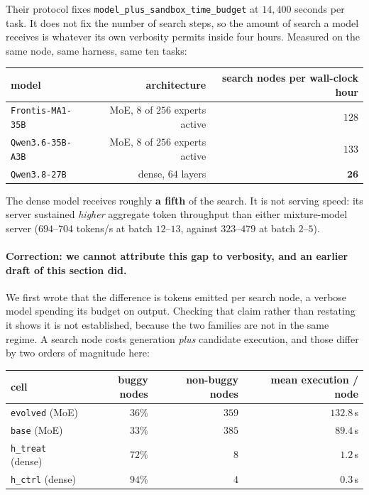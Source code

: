 Their protocol fixes \texttt{model\_plus\_sandbox\_time\_budget} at $14{,}400$ seconds per
task. It does not fix the number of search steps, so the amount of search a model receives is
whatever its own verbosity permits inside four hours. Measured on the same node, same harness,
same ten tasks:

\begin{center}
\begin{tabular}{lrr}
\toprule
model & architecture & search nodes per wall-clock hour \\
\midrule
\texttt{Frontis-MA1-35B}   & MoE, $8$ of $256$ experts active & $128$ \\
\texttt{Qwen3.6-35B-A3B}   & MoE, $8$ of $256$ experts active & $133$ \\
\texttt{Qwen3.8-27B}       & dense, $64$ layers               & $\mathbf{26}$ \\
\bottomrule
\end{tabular}
\end{center}

The dense model receives roughly \textbf{a fifth} of the search. It is not serving speed: its
server sustained \emph{higher} aggregate token throughput than either mixture-model server
($694$--$704$ tokens/s at batch $12$--$13$, against $323$--$479$ at batch $2$--$5$).

\paragraph{Correction: we cannot attribute this gap to verbosity, and an earlier draft of this
section did.}
We first wrote that the difference is tokens emitted per search node, a verbose model spending
its budget on output. Checking that claim rather than restating it shows it is not
established, because the two families are not in the same regime. A search node costs
generation \emph{plus} candidate execution, and those differ by two orders of magnitude here:

\begin{center}
\begin{tabular}{lrrr}
\toprule
cell & buggy nodes & non-buggy nodes & mean execution / node \\
\midrule
\texttt{evolved} (MoE)    & $36\%$ & $359$ & $132.8$\,s \\
\texttt{base} (MoE)       & $33\%$ & $385$ & $89.4$\,s \\
\texttt{h\_treat} (dense) & $72\%$ & $8$   & $1.2$\,s \\
\texttt{h\_ctrl} (dense)  & $94\%$ & $4$   & $0.3$\,s \\
\bottomrule
\end{tabular}
\end{center}

